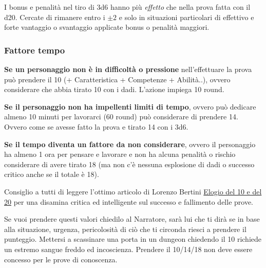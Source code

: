 \begin{multicols}{2}
\begin{changemargin}{0.3cm}{0.3cm}\begin{narratore}
I bonus e penalità nel tiro di 3d6 hanno più \emph{effetto} che nella prova fatta con il d20. Cercate di rimanere entro i $\pm2$ e solo in situazioni particolari di effettivo e forte vantaggio o svantaggio applicate bonus o penalità maggiori.
\end{narratore}\end{changemargin}

\subsubsection{Fattore tempo}\label{fattoretempo}

\textbf{Se un personaggio non è in difficoltà o pressione} nell'effettuare la prova può prendere il 10 (+ Caratteristica + Competenze + Abilità..), ovvero considerare che abbia tirato 10 con i dadi. L'azione impiega 10 round. \label{prendere10}

\textbf{Se il personaggio non ha impellenti limiti di tempo}, ovvero può dedicare almeno 10 minuti per lavorarci (60 round) può considerare di prendere 14. Ovvero come se avesse fatto la prova e tirato 14 con i 3d6. \label{prendere14}

\textbf{Se il tempo diventa un fattore da non considerare}, ovvero il personaggio ha almeno 1 ora per pensare e lavorare e non ha alcuna penalità o rischio considerare di avere tirato 18 (ma non c'è nessuna esplosione di dadi o successo critico anche se il totale è 18).\label{prendere18}


\begin{changemargin}{0.3cm}{0.3cm}\begin{narratore}
Consiglio a tutti di leggere l'ottimo articolo di Lorenzo Bertini \href{https://dietroschermo.wordpress.com/2022/03/10/elogio-del-10-e-del-20}{Elogio del 10 e del 20} per una disamina critica ed intelligente sul successo e fallimento delle prove.
\end{narratore}\end{changemargin}


Se vuoi prendere questi valori chiedilo al Narratore, sarà lui che ti dirà se in base alla situazione, urgenza, pericolosità di ciò che ti circonda riesci a prendere il punteggio. Mettersi a scassinare una porta in un dungeon chiedendo il 10 richiede un estremo sangue freddo ed incoscienza. Prendere il 10/14/18 non deve essere concesso per le prove di conoscenza.


\end{multicols}
